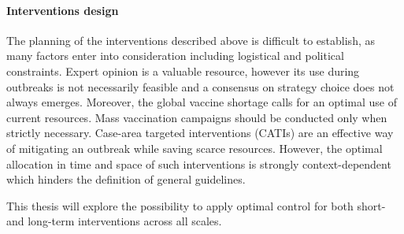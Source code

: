 
\paragraph{Interventions design} The planning of the interventions described above is difficult to establish, as many factors enter into consideration including logistical and political constraints. Expert opinion is a valuable resource, however its use during outbreaks is not necessarily feasible and a consensus on strategy choice does not always emerges\cite{Cyranoski:CholeraVaccinePlan:2011}. Moreover, the global vaccine shortage\cite{Parker:AdaptingGlobalShortage:2017a,Seidlein:PreventingCholeraOutbreaks:2018} calls for an optimal use of current resources. Mass vaccination campaigns should be conducted only when strictly necessary. Case-area targeted interventions (CATIs) are an effective way of mitigating an outbreak while saving scarce resources. However, the optimal allocation in time and space of such interventions is strongly context-dependent which hinders the definition of general guidelines\cite{Eubank:ModellingDiseaseOutbreaks:2004,Finger:PotentialImpactCasearea:2018,Seidlein:PreventingCholeraOutbreaks:2018,Azman:MicrohotspotsRiskUrban:2018,Lessler:MappingBurdenCholera:2018,Rebaudet:DrySeasonHaiti:2013}. 

This thesis will explore the possibility to apply optimal control for  both short- and long-term interventions across all scales. 